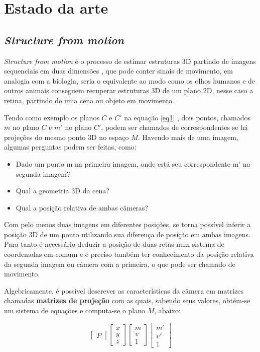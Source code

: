 \chapter{Estado da arte}

\section{\textit{Structure from motion}}

\textit{Structure from motion} é o processo de estimar estruturas 3D partindo de imagens sequenciais em duas dimensões \cite{SFM}, que pode conter sinais de movimento, em analogia com a biologia, seria o equivalente ao modo  como os olhos humanos e de outros animais conseguem recuperar estruturas 3D de um plano 2D, nesse caso a retina, partindo de uma cena ou objeto em movimento.

Tendo como exemplo os planos $C$ e $C'$ na equação \eqref{eq1} , dois pontos, chamados $m$ no plano $C$ e $m'$ no plano $C'$, podem ser chamados de correspondentes se há projeções do mesmo ponto 3D no espaço $M$. Havendo mais de uma imagem, algumas perguntas podem ser feitas, como:

\begin{itemize}
	\item{Dado um ponto m na primeira imagem, onde está seu correspondente m’ na segunda imagem?}
	\item{Qual a geometria 3D da cena?}
	\item{Qual a posição relativa de ambas câmeras?}
\end{itemize}
	
Com pelo menos duas imagens em diferentes posições, se torna possível inferir a posição 3D de um ponto utilizando sua diferença de posição em ambas imagens. Para tanto é necessário deduzir a posição de duas retas num sistema de coordenadas em comum e é preciso também ter conhecimento da posição relativa da segunda imagem ou câmera com a primeira, o que pode ser chamado de movimento.

Algebricamente, é possível descrever as características da câmera em matrizes chamadas \textbf{matrizes de projeção} \cite{Faugeras-Geometry} com as quais, sabendo seus valores, obtém-se um sistema de equações e computa-se o plano $M$, abaixo:

 \begin{equation}\label{eq1}
	\begin{bmatrix}
		P
	\end{bmatrix}
	\begin{bmatrix}
		x\\y\\z
	\end{bmatrix}
	\begin{bmatrix}
		m\\v\\1
	\end{bmatrix}
	\begin{bmatrix}
		m'\\v'\\1
	\end{bmatrix}
\end{equation}	
 


